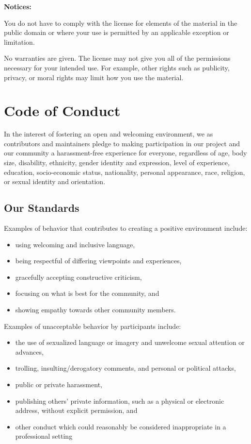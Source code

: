 \documentclass[
]{krantz}
\providecommand{\tightlist}{%
  \setlength{\itemsep}{0pt}\setlength{\parskip}{0pt}}
\begin{document}
\textbf{Notices:}

You do not have to comply with the license for elements of the
material in the public domain or where your use is permitted by an
applicable exception or limitation.

No warranties are given. The license may not give you all of the
permissions necessary for your intended use. For example, other rights
such as publicity, privacy, or moral rights may limit how you use the
material.

\hypertarget{conduct}{%
\chapter{Code of Conduct}\label{conduct}}

In the interest of fostering an open and welcoming environment, we as
contributors and maintainers pledge to making participation in our project and
our community a harassment-free experience for everyone, regardless of age, body
size, disability, ethnicity, gender identity and expression, level of
experience, education, socio-economic status, nationality, personal appearance,
race, religion, or sexual identity and orientation.

\hypertarget{conduct-standards}{%
\section{Our Standards}\label{conduct-standards}}

Examples of behavior that contributes to creating a positive environment
include:

\begin{itemize}
\tightlist
\item
  using welcoming and inclusive language,
\item
  being respectful of differing viewpoints and experiences,
\item
  gracefully accepting constructive criticism,
\item
  focusing on what is best for the community, and
\item
  showing empathy towards other community members.
\end{itemize}

Examples of unacceptable behavior by participants include:

\begin{itemize}
\tightlist
\item
  the use of sexualized language or imagery and unwelcome sexual
  attention or advances,
\item
  trolling, insulting/derogatory comments, and personal or political
  attacks,
\item
  public or private harassment,
\item
  publishing others' private information, such as a physical or
  electronic address, without explicit permission, and
\item
  other conduct which could reasonably be considered inappropriate in
  a professional setting
\end{itemize}
\end{document}
